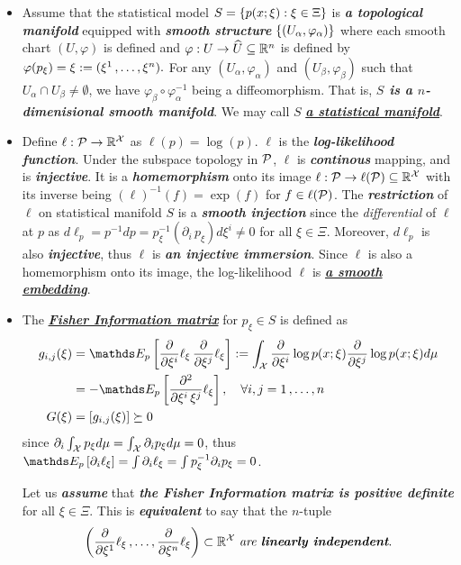 \documentclass[11pt]{article}
\begin{document}
\begin{itemize}
\item Assume that the statistical model $S = \left\{p(x; \xi): \xi \in \Xi\right\}$ is \emph{\textbf{a topological manifold}} equipped with \emph{\textbf{smooth structure}}  $\left\{(U_{\alpha}, \varphi_{\alpha})\right\}$ where each smooth chart $(U, \varphi)$ is defined and $\varphi: U \rightarrow \widehat{U} \subseteq {\mathbb R}^n$ is defined by $\varphi(p_{\xi}) = \xi := (\xi^1 \,{,}\ldots{,}\, \xi^n).$ For any $(U_{\alpha}, \varphi_{\alpha})$ and $(U_{\beta}, \varphi_{\beta})$ such that $U_{\alpha} \cap U_{\beta} \neq \emptyset$, we have $\varphi_{\beta} \circ \varphi_{\alpha}^{-1}$ being a diffeomorphism. That is, \emph{\textbf{$S$ is a $n$-dimenisional smooth manifold}}. We may call $S$ \underline{\emph{\textbf{a statistical manifold}}}.

\item Define $\ell: {\mathcal P} \rightarrow {\mathbb R}^{{\mathcal X}}$ as $\ell(p) = \log(p)$. $\ell$ is  the \emph{\textbf{log-likelihood function}}. Under the subspace topology in ${\mathcal P}$,  $\ell$ is \emph{\textbf{continous}} mapping, and is \emph{\textbf{injective}}. It is a \emph{\textbf{homemorphism}} onto its image $\ell: {\mathcal P} \rightarrow \ell({\mathcal P}) \subseteq {\mathbb R}^{{\mathcal X}}$ with its inverse being $(\ell)^{-1}(f) = \exp(f)$ for $f \in \ell({\mathcal P})$. The \emph{\textbf{restriction}} of $\ell$ on statistical manifold $S$ is a \emph{\textbf{smooth injection}} since the \emph{differential} of $\ell$ at $p$ as $d\ell_{p} = p^{-1}dp = p_{\xi}^{-1}(\partial_i\,p_{\xi}) d\xi^i \neq 0$ for all $\xi \in \Xi$. Moreover, $d\ell_p$ is also \emph{\textbf{injective}}, thus $\ell$ is \emph{\textbf{an injective immersion}}. Since $\ell$ is also a homemorphism onto its image, the log-likelihood $\ell$ is \underline{\emph{\textbf{a smooth embedding}}}.

\item The \underline{\emph{\textbf{Fisher Information matrix}}} for $p_\xi \in S$ is defined  as 
\begin{align}
g_{i,j}(\xi) &= \E{p}{\partdiff{}{\xi^i}\ell_{\xi}\, \partdiff{}{\xi^j}\ell_{\xi} } := \int_{\cX}\partdiff{}{\xi^i}\log p(x; \xi) \partdiff{}{\xi^j}\log p(x; \xi) d\mu  \label{eqn: fisher_info_mat} \\
&= - \E{p}{\partdiff{^2 }{\xi^i\,\xi^j}\ell_{\xi}}, \quad \forall i,j =1 \xdotx{,} n \nonumber\\
G(\xi) &= [g_{i,j}(\xi)] \succeq 0 \nonumber
\end{align} since $\partial_i \int_{{\mathcal X}} p_{\xi}d\mu = \int_{{\mathcal X}} \partial_i p_{\xi} d\mu = 0$, thus $\E{p}{\partial_i \ell_{\xi}} = \int \partial_i \ell_{\xi} = \int p_{\xi}^{-1} \partial_i p_{\xi} = 0$. 

Let us \emph{\textbf{assume}} that \emph{\textbf{the Fisher Information matrix is positive definite}} for all $\xi \in \Xi$. This is \emph{\textbf{equivalent}} to say that the $n$-tuple 
\begin{align*}
\left(\frac{\partial }{ \partial \xi^1}\ell_{\xi} \,{,}\ldots{,}\, \frac{\partial }{ \partial \xi^n}\ell_{\xi}\right) \subset {\mathbb R}^{{\mathcal X}} \text{ \emph{are \textbf{linearly independent}}.}
\end{align*}
\end{itemize}
\end{document}
